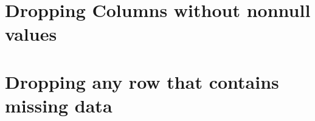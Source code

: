 \documentclass[letterpaper,10pt,english]{sphinxmanual}
\begin{document}
\begin{sphinxVerbatim}[commandchars=\\\{\}]
\end{sphinxVerbatim}


\section{Dropping Columns without non\sphinxhyphen{}null values}
\label{\detokenize{2020-08-18-Pyspark-NAs:dropping-columns-without-non-null-values}}
\begin{sphinxVerbatim}[commandchars=\\\{\}]
\end{sphinxVerbatim}


\section{Dropping any row that contains missing data}
\label{\detokenize{2020-08-18-Pyspark-NAs:dropping-any-row-that-contains-missing-data}}
\begin{sphinxVerbatim}[commandchars=\\\{\}]
\end{sphinxVerbatim}

\begin{sphinxVerbatim}[commandchars=\\\{\}]
\PYG{p}{[}\PYG{p}{]}
\end{sphinxVerbatim}

\begin{sphinxVerbatim}[commandchars=\\\{\}]
\end{sphinxVerbatim}

\begin{sphinxVerbatim}[commandchars=\\\{\}]
\end{sphinxVerbatim}
\end{document}

